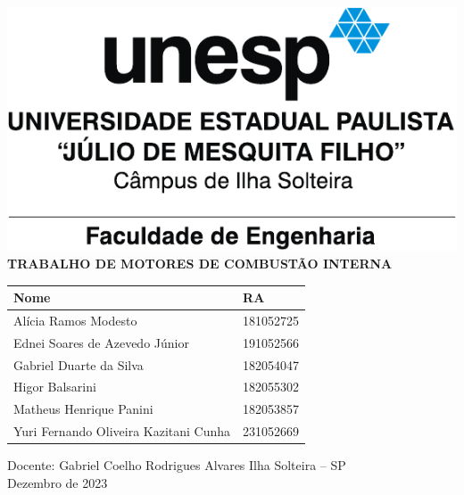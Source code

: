 \documentclass[
    12pt,                %
    brazil,              %
    a4paper,             %
    openany,             %
    oneside,             %
    chapter=TITLE,       %
]{abntex2}
\renewcommand{\sffamily}{\rmfamily}
\renewcommand{\imprimircapa}{%
    \begin{center}\sffamily
        \includegraphics{./figuras/feis_unesp.pdf}
        \vfill
        {\bfseries\large TRABALHO DE MOTORES DE COMBUSTÃO INTERNA}
        \vfill
        \begin{tabular}{ll}
            Nome & RA \\ \hline
            Alícia Ramos Modesto                  & 181052725 \\
            Ednei Soares de Azevedo Júnior        & 191052566 \\
            Gabriel Duarte da Silva               & 182054047 \\
            Higor Balsarini                       & 182055302 \\
            Matheus Henrique Panini               & 182053857 \\
            Yuri Fernando Oliveira Kazitani Cunha & 231052669
        \end{tabular}
        \vfill
        Docente: Gabriel Coelho Rodrigues Alvares
        \vfill
        Ilha Solteira -- SP \\
        Dezembro de 2023
    \end{center}
    \clearpage
}
\begin{document}
%
\imprimircapa\clearpage    %
\listoffigures*\clearpage   %
\listoftables*\clearpage    %
\tableofcontents*\clearpage %

\textual






\printbibliography
	
\end{document}
